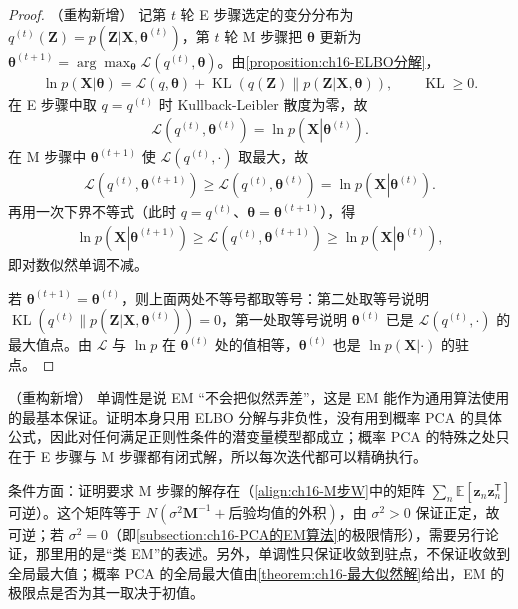 \documentclass[../../main.tex]{subfiles}
\begin{document}
\begin{proof}（重构新增）
记第 $t$ 轮 E 步骤选定的变分分布为 $q^{(t)}(\bm{Z})=p(\bm{Z}|\bm{X},\bm{\theta}^{(t)})$，第 $t$ 轮 M 步骤把 $\bm{\theta}$ 更新为 $\bm{\theta}^{(t+1)}=\arg\max_{\bm{\theta}}\mathcal{L}(q^{(t)},\bm{\theta})$。由\cref{proposition:ch16-ELBO分解}，
\begin{align*}
  \ln p(\bm{X}|\bm{\theta})=\mathcal{L}(q,\bm{\theta})+\operatorname{KL}\left(q(\bm{Z})\|p(\bm{Z}|\bm{X},\bm{\theta})\right),\qquad \operatorname{KL}\geqslant0.
\end{align*}
在 E 步骤中取 $q=q^{(t)}$ 时 Kullback-Leibler 散度为零，故
\begin{align*}
  \mathcal{L}\left(q^{(t)},\bm{\theta}^{(t)}\right)=\ln p\left(\bm{X}\left|\bm{\theta}^{(t)}\right.\right).
\end{align*}
在 M 步骤中 $\bm{\theta}^{(t+1)}$ 使 $\mathcal{L}(q^{(t)},\cdot)$ 取最大，故
\begin{align*}
  \mathcal{L}\left(q^{(t)},\bm{\theta}^{(t+1)}\right)\geqslant\mathcal{L}\left(q^{(t)},\bm{\theta}^{(t)}\right)=\ln p\left(\bm{X}\left|\bm{\theta}^{(t)}\right.\right).
\end{align*}
再用一次下界不等式（此时 $q=q^{(t)}$、$\bm{\theta}=\bm{\theta}^{(t+1)}$），得
\begin{align*}
  \ln p\left(\bm{X}\left|\bm{\theta}^{(t+1)}\right.\right)\geqslant\mathcal{L}\left(q^{(t)},\bm{\theta}^{(t+1)}\right)\geqslant\ln p\left(\bm{X}\left|\bm{\theta}^{(t)}\right.\right),
\end{align*}
即对数似然单调不减。

若 $\bm{\theta}^{(t+1)}=\bm{\theta}^{(t)}$，则上面两处不等号都取等号：第二处取等号说明 $\operatorname{KL}(q^{(t)}\|p(\bm{Z}|\bm{X},\bm{\theta}^{(t)}))=0$，第一处取等号说明 $\bm{\theta}^{(t)}$ 已是 $\mathcal{L}(q^{(t)},\cdot)$ 的最大值点。由 $\mathcal{L}$ 与 $\ln p$ 在 $\bm{\theta}^{(t)}$ 处的值相等，$\bm{\theta}^{(t)}$ 也是 $\ln p(\bm{X}|\cdot)$ 的驻点。
\end{proof}

\begin{remark}（重构新增）
单调性是说 EM “不会把似然弄差”，这是 EM 能作为通用算法使用的最基本保证。证明本身只用 ELBO 分解与非负性，没有用到概率 PCA 的具体公式，因此对任何满足正则性条件的潜变量模型都成立；概率 PCA 的特殊之处只在于 E 步骤与 M 步骤都有闭式解，所以每次迭代都可以精确执行。

条件方面：证明要求 M 步骤的解存在（\eqref{align:ch16-M步W}中的矩阵 $\sum_n\mathbb{E}[\bm{z}_n\bm{z}_n^{\mathsf T}]$ 可逆）。这个矩阵等于 $N(\sigma^2\bm{M}^{-1}+\text{后验均值的外积})$，由 $\sigma^2>0$ 保证正定，故可逆；若 $\sigma^2=0$（即\cref{subsection:ch16-PCA的EM算法}的极限情形），需要另行论证，那里用的是“类 EM”的表述。另外，单调性只保证收敛到驻点，不保证收敛到全局最大值；概率 PCA 的全局最大值由\cref{theorem:ch16-最大似然解}给出，EM 的极限点是否为其一取决于初值。
\end{remark}
\end{document}
